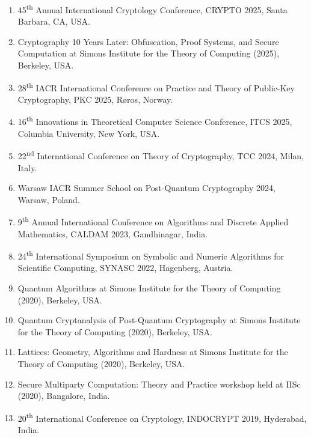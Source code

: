 \documentclass[margin]{res} %
\begin{document}
\begin{resume}
\begin{enumerate}
    \item 45\textsuperscript{th} Annual International Cryptology Conference, CRYPTO 2025, Santa Barbara, CA, USA.
    
    \item Cryptography 10 Years Later: Obfuscation, Proof Systems, and Secure Computation at Simons Institute for the Theory of Computing (2025), Berkeley, USA.
    
    \item 28\textsuperscript{th} IACR International Conference on Practice and Theory of Public-Key Cryptography, PKC 2025, Røros, Norway.


    \item 16\textsuperscript{th} Innovations in Theoretical Computer Science Conference, ITCS 2025, Columbia University, New York, USA.

    \item 22\textsuperscript{nd} International Conference on Theory of Cryptography, TCC 2024, Milan, Italy.
    
    \item Warsaw IACR Summer School on Post-Quantum Cryptography 2024, Warsaw, Poland. 
    
    \item 9\textsuperscript{th} Annual International Conference on Algorithms and Discrete Applied Mathematics, CALDAM 2023, Gandhinagar, India.
    
    \item 24\textsuperscript{th} International Symposium on Symbolic and Numeric Algorithms for Scientific Computing, SYNASC 2022, Hagenberg, Austria.
    
    \item Quantum Algorithms at Simons Institute for the Theory of Computing (2020), Berkeley, USA.
    
    \item Quantum Cryptanalysis of Post-Quantum Cryptography at Simons Institute for the Theory of Computing (2020), Berkeley, USA.
    
    \item Lattices: Geometry, Algorithms and Hardness at Simons Institute for the Theory of Computing (2020), Berkeley, USA.
    
    \item Secure Multiparty Computation: Theory and Practice workshop held at IISc (2020), Bangalore, India.
    
    \item 20\textsuperscript{th} International Conference on Cryptology, INDOCRYPT 2019, Hyderabad, India.
    

\end{enumerate}
\end{resume}
\end{document}
